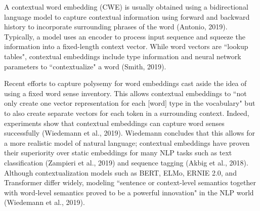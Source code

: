 A contextual word embedding (CWE) is usually obtained using a bidirectional language model to capture contextual information using forward and backward history to incorporate surrounding phrases of the word (Antonio, 2019). Typically, a model uses an encoder to process input sequence and squeeze the information into a fixed-length context vector. While word vectors are ``lookup tables", contextual embeddings include type information and neural network parameters to ``contextualize" a word (Smith, 2019). 

Recent efforts to capture polysemy for word embeddings cast aside the idea of using a fixed word sense inventory. This allows contextual embeddings to ``not only create one vector representation for each [word] type in the vocabulary" but to also create separate vectors for each token in a surrounding context. Indeed, experiments show that contextual embeddings can capture word senses successfully (Wiedemann et al., 2019). Wiedemann concludes that this allows for a more realistic model of natural language; contextual embeddings have proven their superiority over static embeddings for many NLP tasks such as text classification (Zampieri et al., 2019) and sequence tagging (Akbig et al., 2018). Although contextualization models such as BERT, ELMo, ERNIE 2.0, and Transformer differ widely, modeling ``sentence or context-level semantics together with word-level semantics proved to be a powerful innovation" in the NLP world (Wiedemann et al., 2019). 


